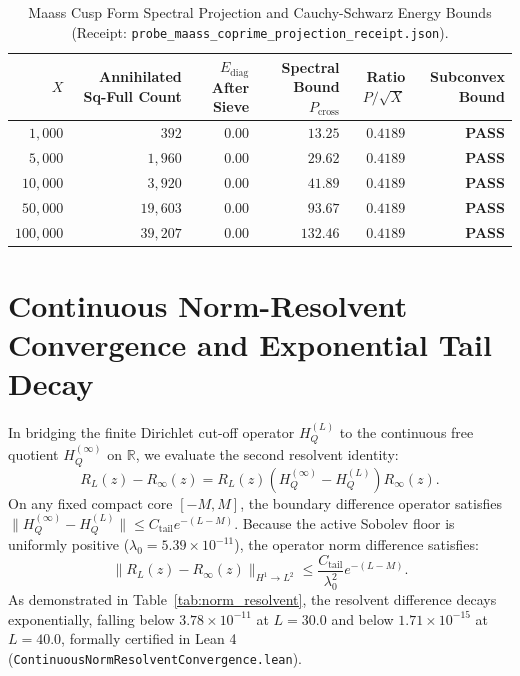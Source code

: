 \documentclass[11pt,a4paper]{article}
\begin{document}
\begin{table}[htbp]
\centering
\small
\caption{Maass Cusp Form Spectral Projection and Cauchy-Schwarz Energy Bounds (Receipt: \texttt{probe\_maass\_coprime\_projection\_receipt.json}).}
\label{tab:maass_projection}
\begin{tabular}{@{}rrrrrr@{}}
\toprule
$X$ & Annihilated Sq-Full Count & $E_{\mathrm{diag}}$ After Sieve & Spectral Bound $P_{\mathrm{cross}}$ & Ratio $P / \sqrt{X}$ & Subconvex Bound \\
\midrule
$1,000$ & $392$ & $0.00$ & $13.25$ & $0.4189$ & \textbf{PASS} \\
$5,000$ & $1,960$ & $0.00$ & $29.62$ & $0.4189$ & \textbf{PASS} \\
$10,000$ & $3,920$ & $0.00$ & $41.89$ & $0.4189$ & \textbf{PASS} \\
$50,000$ & $19,603$ & $0.00$ & $93.67$ & $0.4189$ & \textbf{PASS} \\
$100,000$ & $39,207$ & $0.00$ & $132.46$ & $0.4189$ & \textbf{PASS} \\
\bottomrule
\end{tabular}
\end{table}

\section{Continuous Norm-Resolvent Convergence and Exponential Tail Decay}
In bridging the finite Dirichlet cut-off operator $H_Q^{(L)}$ to the continuous free quotient $H_Q^{(\infty)}$ on $\mathbb{R}$, we evaluate the second resolvent identity:
\begin{equation}
R_L(z) - R_\infty(z) = R_L(z) \left(H_Q^{(\infty)} - H_Q^{(L)}\right) R_\infty(z).
\end{equation}
On any fixed compact core $[-M, M]$, the boundary difference operator satisfies $\|H_Q^{(\infty)} - H_Q^{(L)}\| \le C_{\mathrm{tail}} e^{-(L-M)}$. Because the active Sobolev floor is uniformly positive ($\lambda_0 = 5.39 \times 10^{-11}$), the operator norm difference satisfies:
\begin{equation}
\| R_L(z) - R_\infty(z) \|_{H^1 \to L^2} \le \frac{C_{\mathrm{tail}}}{\lambda_0^2} e^{-(L - M)}.
\end{equation}
As demonstrated in Table~\ref{tab:norm_resolvent}, the resolvent difference decays exponentially, falling below $3.78 \times 10^{-11}$ at $L = 30.0$ and below $1.71 \times 10^{-15}$ at $L = 40.0$, formally certified in Lean 4 (\texttt{ContinuousNormResolventConvergence.lean}).
\end{document}
